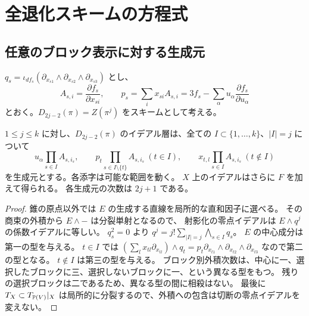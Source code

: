 \section{全退化スキームの方程式}\label{sec:pg-degeneracy}
\subsection{任意のブロック表示に対する生成元}
$q_s=\iota_{df_s}(\partial_{x_{s1}}\wedge\partial_{x_{s2}}\wedge\partial_{x_{s3}})$ とし、
\begin{equation}
A_{s,i}=\frac{\partial f_s}{\partial x_{si}},\qquad
p_s=\sum_i x_{si}A_{s,i}=3f_s-\sum_\alpha u_\alpha\frac{\partial f_s}{\partial u_\alpha}
\end{equation}
とおく。$D_{2j-2}(\pi)=Z(\pi^j)$ をスキームとして考える。
\begin{proposition}\label{prop:pg-deg-ideal}
$1\leq j\leq k$ に対し、$D_{2j-2}(\pi)$ のイデアル層は、全ての
$I\subset\{1,\ldots,k\}$、$|I|=j$ について
\begin{equation}
 u_\alpha\prod_{s\in I}A_{s,i_s},\qquad
 p_t\prod_{s\in I\setminus\{t\}}A_{s,i_s}\ (t\in I),\qquad
 x_{t,l}\prod_{s\in I}A_{s,i_s}\ (t\notin I)\label{eq:pg-deg-generators}
\end{equation}
を生成元とする。各添字は可能な範囲を動く。
$X$ 上のイデアルはさらに $F$ を加えて得られる。
各生成元の次数は $2j+1$ である。
\end{proposition}
\begin{proof}
錐の原点以外では $E$ の生成する直線を局所的な直和因子に選べる。
その商束の外積から $E\wedge-$ は分裂単射となるので、
射影化の零点イデアルは $E\wedge q^j$ の係数イデアルに等しい。
$q_s^2=0$ より $q^j=j!\sum_{|I|=j}\bigwedge_{s\in I}q_s$。
$E$ の中心成分は第一の型を与える。
$t\in I$ では $(\sum_lx_{tl}\partial_{x_{tl}})\wedge q_t
=p_t\partial_{x_{t1}}\wedge\partial_{x_{t2}}\wedge\partial_{x_{t3}}$ なので第二の型となる。
$t\notin I$ は第三の型を与える。
ブロック別外積次数は、中心に一、選択したブロックに三、選択しないブロックに一、という異なる型をもつ。
残りの選択ブロックは二であるため、異なる型の間に相殺はない。
最後に $T_X\subset T_{\mathbb P(V)}|_X$ は局所的に分裂するので、外積への包含は切断の零点イデアルを変えない。
\end{proof}

